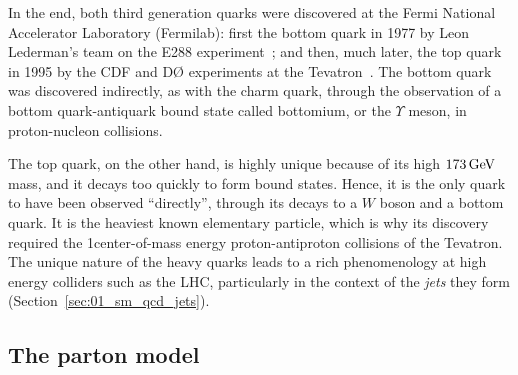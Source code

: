 In the end, both third generation quarks were discovered at the Fermi National Accelerator Laboratory (Fermilab): first the bottom quark in 1977 by Leon Lederman's team on the E288 experiment~\cite{E288:1977xhf}; and then, much later, the top quark in 1995 by the CDF and DØ experiments at the Tevatron~\cite{CDF:1995wbb, D0:1995jca}.
The bottom quark was discovered indirectly, as with the charm quark, through the observation of a bottom quark-antiquark bound state called bottomium, or the $\Upsilon$ meson, in proton-nucleon collisions.

The top quark, on the other hand, is highly unique because of its high $173 \,\text{Ge\hspace{-.08em}V}$ mass, and it decays too quickly to form bound states.
Hence, it is the only quark to have been observed ``directly'', through its decays to a $W$ boson and a bottom quark.
It is the heaviest known elementary particle, which is why its discovery required the 1\TeV center-of-mass energy proton-antiproton collisions of the Tevatron.
The unique nature of the heavy quarks leads to a rich phenomenology at high energy colliders such as the LHC, particularly in the context of the \textit{jets} they form (Section~\ref{sec:01_sm_qcd_jets}).




\subsection{The parton model}
\label{sec:01_sm_qcd_quarks_parton}


